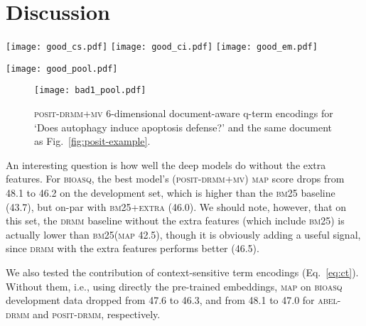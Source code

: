 \documentclass[11pt,a4paper]{article}
\newcommand{\bioasq}{\textsc{bioasq}\xspace}
\newcommand{\drmm}{\textsc{drmm}\xspace}
\newcommand{\abeldrmm}{\textsc{abel-drmm}\xspace}
\newcommand{\positdrmm}{\textsc{posit-drmm}\xspace}
\newcommand{\positdrmmmv}{\textsc{posit-drmm+mv}\xspace}
\newcommand{\bmtf}{\textsc{bm25}\xspace}
\newcommand{\map}{\textsc{map}\xspace}
\begin{document}
\section{Discussion}

\begin{figure*}[th]
\begin{minipage}{4.1in}
\texttt{[image: good\_cs.pdf]}
\texttt{[image: good\_ci.pdf]}
\texttt{[image: good\_em.pdf]}
\end{minipage}
\begin{minipage}{2in}
\texttt{[image: good\_pool.pdf]}
\vspace{0.1in}
\end{minipage}
\vspace{-0.1in}
\caption{Left: Cosine similarities (\positdrmm attention) of query and document terms, with context-sensitive, context-insensitive, and exact match views of the terms (top to bottom). Document truncated to 50 words. White is stronger. Right: Corresponding \positdrmmmv 6-dimensional document-aware query term encodings.}
\label{fig:posit-example}
\vspace{-0.1in}
\end{figure*}

\begin{figure}[t]
\begin{center}
\texttt{[image: bad1\_pool.pdf]}
\end{center}
\vspace{-0.2in}
\caption{\positdrmmmv 6-dimensional document-aware q-term encodings for  `Does autophagy induce apoptosis defense?' and the same document as Fig.~\ref{fig:posit-example}.}
\label{fig:posit-bad-example}
\vspace{-0.2in}
\end{figure}

An interesting question is how well the deep models do without the extra features. For \bioasq, the best model's (\positdrmmmv) \map score drops from 48.1 to 46.2 on the development set, which is higher than the \bmtf baseline (43.7), but on-par with \textsc{bm25+extra} (46.0).
We should note, however, that on this set, the \drmm baseline without the extra features (which include \bmtf) is actually lower than \bmtf (\map 42.5), though it is obviously adding a useful signal, since \drmm with the extra features performs better (46.5).

We also tested the contribution of context-sensitive term encodings (Eq.~\ref{eq:ct}). Without them, i.e., using directly the pre-trained embeddings, \map on \bioasq development data dropped from 47.6 to 46.3, and from 48.1 to 47.0 for \abeldrmm and \positdrmm, respectively.
\end{document}

